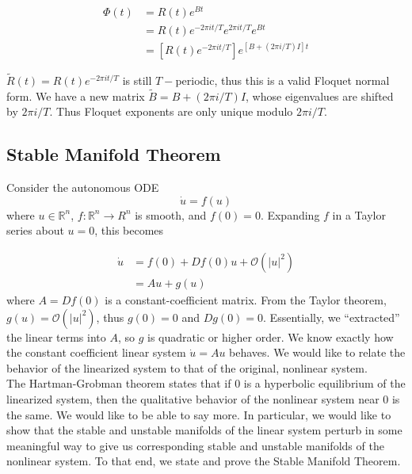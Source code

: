 \documentclass{article}
\def\R{{\mathbb R}}
\begin{document}
\begin{align*}
\Phi(t) &= R(t) e^{Bt}  \\
&= R(t) e^{-2\pi i t/T}e^{2\pi i t/T}e^{Bt} \\
&= [ R(t) e^{-2\pi i t/T} ] e^{[B + (2 \pi i/T) I]t}
\end{align*}

$\tilde{R}(t) = R(t) e^{-2\pi i t/T}$ is still $T-$periodic, thus this is a valid Floquet normal form. We have a new matrix $\tilde{B} = B + (2 \pi i/T) I$, whose eigenvalues are shifted by $2 \pi i/T$. Thus Floquet exponents are only unique modulo $2 \pi i/T$.

\subsection{Stable Manifold Theorem}

Consider the autonomous ODE
\begin{equation}
\dot{u} = f(u)
\end{equation}
where $u \in \R^n$, $f: \R^n \rightarrow R^n$ is smooth, and $f(0) = 0$. Expanding $f$ in a Taylor series about $u = 0$, this becomes

\begin{align*}
\dot{u} &= f(0) + Df(0)u + \mathcal{O}(|u|^2) \\
&= Au + g(u)
\end{align*}
where $A = Df(0)$ is a constant-coefficient matrix. From the Taylor theorem, $g(u) = \mathcal{O}(|u|^2)$, thus $g(0) = 0$ and $Dg(0) = 0$. Essentially, we ``extracted'' the linear terms into $A$, so $g$ is quadratic or higher order. We know exactly how the constant coefficient linear system $\dot{u} = Au$ behaves. We would like to relate the behavior of the linearized system to that of the original, nonlinear system.\\

The Hartman-Grobman theorem states that if 0 is a hyperbolic equilibrium of the linearized system, then the qualitative behavior of the nonlinear system near 0 is the same. We would like to be able to say more. In particular, we would like to show that the stable and unstable manifolds of the linear system perturb in some meaningful way to give us corresponding stable and unstable manifolds of the nonlinear system. To that end, we state and prove the Stable Manifold Theorem.\\
\end{document}
